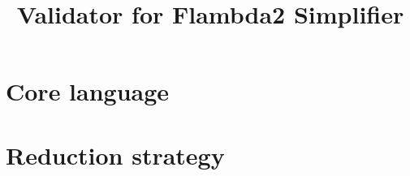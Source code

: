 \documentclass[11pt,fleqn]{amsart}
\begin{document}
\title{Validator for Flambda2 Simplifier}
\date{}
\maketitle{}


\section{Core language}

\section{Reduction strategy}

\newcommand{\letexp}[3]{\mathsf{let}\; #1 \; = \; #2 \; \mathsf{in} \; #3}
\newcommand{\subst}[3]{#1 \; [ #2 \setminus #3 ]}
\newcommand{\letcont}[4]{#1 \; \mathsf{where} \; #2 \; #3 \; = \; #4}
\newcommand{\step}{\longrightarrow}
\newcommand{\applycont}[2]{#1 \; #2}
\newcommand{\apply}[4]{#1 \; \, #2 \; \, #3 \; \, #4}
\newcommand{\abst}[2]{\lambda \; #1.\, #2}
\newcommand{\switch}[2]{\mathsf{switch}\; (#1) \; #2}
\newcommand{\args}[1]{\overrightarrow{#1}}
\end{document}
